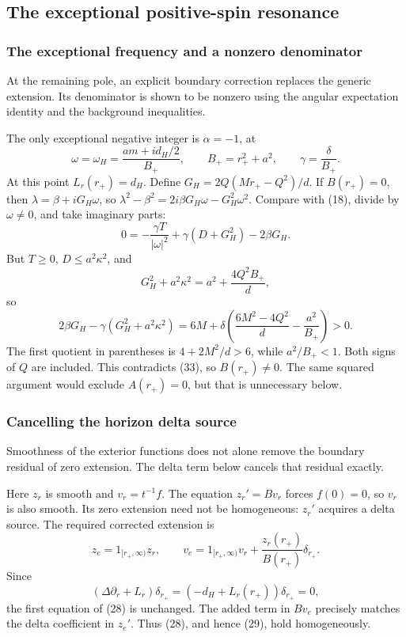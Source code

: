 \documentclass[11pt,a4paper]{article}
\begin{document}
\subsection{The exceptional positive-spin
resonance}\label{the-exceptional-positive-spin-resonance}

\subsubsection{The exceptional frequency and a nonzero denominator}\label{readable-resonance-denominator}

At the remaining pole, an explicit boundary correction replaces the generic extension. Its denominator is shown to be nonzero using the angular expectation identity and the background inequalities.

The only exceptional negative integer is \(\alpha=-1\), at \[
 \omega=\omega_H=\frac{am+id_H/2}{B_+},\qquad
 B_+=r_+^2+a^2,\qquad \gamma=\frac{\delta}{B_+}.
 \tag{32}
\] At this point \(L_r(r_+)=d_H\). Define \(G_H=2Q(Mr_+-Q^2)/d\). If
\(B(r_+)=0\), then \(\lambda=\beta+iG_H\omega\), so
\(\lambda^2-\beta^2=2i\beta G_H\omega-G_H^2\omega^2\). Compare with
(18), divide by \(\omega\ne0\), and take imaginary parts: \[
 0=-\frac{\gamma T}{|\omega|^2}
       +\gamma(D+G_H^2)-2\beta G_H .
 \tag{33}
\] But \(T\ge0\), \(D\le a^2\kappa^2\), and \[
 G_H^2+a^2\kappa^2=a^2+\frac{4Q^2B_+}{d},
\] so \[
 2\beta G_H-\gamma(G_H^2+a^2\kappa^2)
 =6M+\delta\left(\frac{6M^2-4Q^2}{d}-\frac{a^2}{B_+}\right)>0.
 \tag{34}
\] The first quotient in parentheses is \(4+2M^2/d>6\), while
\(a^2/B_+<1\). Both signs of \(Q\) are included. This contradicts (33),
so \(B(r_+)\ne0\). The same squared argument would exclude \(A(r_+)=0\),
but that is unnecessary below.

\subsubsection{Cancelling the horizon delta source}\label{readable-delta-correction}

Smoothness of the exterior functions does not alone remove the boundary residual of zero extension. The delta term below cancels that residual exactly.

Here \(z_r\) is smooth and \(v_r=t^{-1}f\). The equation \(z_r'=Bv_r\)
forces \(f(0)=0\), so \(v_r\) is also smooth. Its zero extension need
not be homogeneous: \(z_r'\) acquires a delta source. The required
corrected extension is \[
 z_e=1_{[r_+,\infty)}z_r,\qquad
 v_e=1_{[r_+,\infty)}v_r+
       \frac{z_r(r_+)}{B(r_+)}\delta_{r_+}.
 \tag{35}
\] Since \[
 (\Delta\partial_r+L_r)\delta_{r_+}
 =(-d_H+L_r(r_+))\delta_{r_+}=0,
\] the first equation of (28) is unchanged. The added term in \(Bv_e\)
precisely matches the delta coefficient in \(z_e'\). Thus (28), and
hence (29), hold homogeneously.
\end{document}

